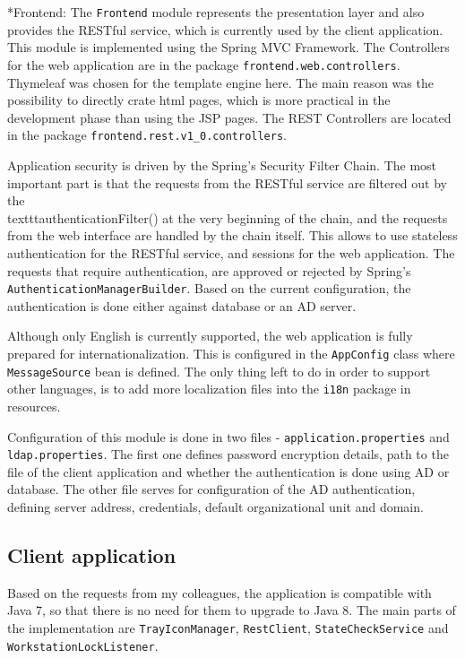 \documentclass[11pt,singleside]{myfithesis2}
\makeatletter
\renewcommand\paragraph{
   \vspace{-10pt}
   \@startsection{paragraph}{4}{0mm}
      {\baselineskip}
      {- 5pt}
      {\normalfont\normalsize\bfseries}
}
\makeatother
\begin{document}
\paragraph*{Frontend: } The \texttt{Frontend} module represents the presentation layer and also provides the RESTful service, which is currently used by the client application. This module is implemented using the Spring MVC Framework. The Controllers for the web application are in the package \texttt{frontend.web.controllers}. Thymeleaf was chosen for the template engine here. The main reason was the possibility to directly crate html pages, which is more practical in the development phase than using the JSP pages. The REST Controllers are located in the package \texttt{frontend.rest.v1\_0.controllers}. 

Application security is driven by the Spring's Security Filter Chain. The most important part is that the requests from the RESTful service are filtered out by the \\texttt{authenticationFilter()} at the very beginning of the chain, and the requests from the web interface are handled by the chain itself. This allows to use stateless authentication for the RESTful service, and sessions for the web application. The requests that require authentication, are approved or rejected by Spring's \texttt{AuthenticationManagerBuilder}. Based on the current configuration, the authentication is done either against database or an AD server.

Although only English is currently supported, the web application is fully prepared for internationalization. This is configured in the \texttt{AppConfig} class where \texttt{MessageSource} bean is defined. The only thing left to do in order to support other languages, is to add more localization files into the \texttt{i18n} package in resources.

Configuration of this module is done in two files - \texttt{application.properties} and \texttt{ldap.properties}. The first one defines password encryption details, path to the file of the client application and whether the authentication is done using AD or database. The other file serves for configuration of the AD authentication, defining server address, credentials, default organizational unit and domain.

		\subsection{Client application}
Based on the requests from my colleagues, the application is compatible with Java 7, so that there is no need for them to upgrade to Java 8. The main parts of the implementation are \texttt{TrayIconManager}, \texttt{RestClient}, \texttt{StateCheckService} and \texttt{WorkstationLockListener}.
\end{document}
